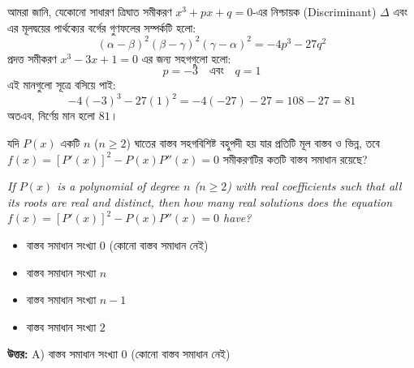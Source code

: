 \documentclass[12pt, a4paper]{article}
\begin{document}
\begin{tcolorbox}[solutionbox={সমাধান (Solution)}]
    \noindent
    আমরা জানি, যেকোনো সাধারণ ত্রিঘাত সমীকরণ $x^3 + px + q = 0$-এর নিশ্চায়ক (Discriminant) $\Delta$ এবং এর মূলদ্বয়ের পার্থক্যের বর্গের গুণফলের সম্পর্কটি হলো:
    \[ (\alpha - \beta)^2(\beta - \gamma)^2(\gamma - \alpha)^2 = -4p^3 - 27q^2 \]
    প্রদত্ত সমীকরণ $x^3 - 3x + 1 = 0$ এর জন্য সহগগুলো হলো:
    \[ p = -3 \quad \text{এবং} \quad q = 1 \]
    এই মানগুলো সূত্রে বসিয়ে পাই:
    \[ -4(-3)^3 - 27(1)^2 = -4(-27) - 27 = 108 - 27 = 81 \]
    অতএব, নির্ণেয় মান হলো $81$।
\end{tcolorbox}
\begin{tcolorbox}[questionbox={প্রশ্ন (Question) 31}]
    \noindent
    যদি $P(x)$ একটি $n$ ($n \ge 2$) ঘাতের বাস্তব সহগবিশিষ্ট বহুপদী হয় যার প্রতিটি মূল বাস্তব ও ভিন্ন, তবে $f(x) = [P'(x)]^2 - P(x)P''(x) = 0$ সমীকরণটির কতটি বাস্তব সমাধান রয়েছে?
    
    \vspace{0.8em}
    \begin{english}
    \noindent\textit{\color{darkgray}
    If $P(x)$ is a polynomial of degree $n$ ($n \ge 2$) with real coefficients such that all its roots are real and distinct, then how many real solutions does the equation $f(x) = [P'(x)]^2 - P(x)P''(x) = 0$ have?
    }
    \end{english}
\end{tcolorbox}

\begin{itemize}[label={}, leftmargin=1cm, itemsep=0.5em]
    \item[\textbf{A)}] বাস্তব সমাধান সংখ্যা $0$ (কোনো বাস্তব সমাধান নেই)
    \item[\textbf{B)}] বাস্তব সমাধান সংখ্যা $n$
    \item[\textbf{C)}] বাস্তব সমাধান সংখ্যা $n-1$
    \item[\textbf{D)}] বাস্তব সমাধান সংখ্যা $2$
\end{itemize}

\vspace{0.5em}
\begin{tcolorbox}[answerbox]
    \textbf{\color{success} উত্তর:} A) বাস্তব সমাধান সংখ্যা $0$ (কোনো বাস্তব সমাধান নেই)
\end{tcolorbox}
\vspace{1em}
\end{document}
